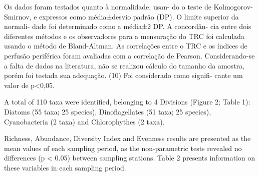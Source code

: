 \begin{multicols}{2}
\lipsum


\par{}Os dados foram testados quanto à normalidade, usan-
do o teste de Kolmogorov-Smirnov, e expressos como
média±desvio padrão (DP). O limite superior da normali-
dade foi determinado como a média±2 DP. A concordân-
cia entre dois diferentes métodos e os observadores para
a mensuração do TRC foi calculada usando o método de
Bland-Altman. As correlações entre o TRC e os índices de
perfusão periférica foram avaliadas com a correlação de
Pearson. Considerando-se a falta de dados na literatura,
não se realizou cálculo do tamanho da amostra, porém foi
testada sua adequação. (10) Foi considerado como signifi-
cante um valor de p<0,05.

\lipsum
{}


\par{}A total of 110 taxa were identified, belonging to
4 Divisions (Figure 2; Table 1): Diatoms (55 taxa;
25 species), Dinoflagellates (51 taxa; 25 species),
Cyanobacteria (2 taxa) and Chlorophythes (2 taxa).
\par{}Richness, Abundance, Diversity Index and Evenness
results are presented as the mean values of each sampling
period, as the non-parametric tests revealed no differences
(p < 0.05) between sampling stations. Table 2 presents
information on these variables in each sampling period.


\lipsum



\lipsum


\lipsum
\lipsum


\lipsum
\lipsum
\lipsum[1]

\end{multicols}

